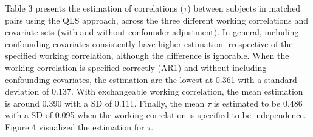 \documentclass[
]{aft}
\begin{document}
\begin{table}[H]
\centering\centering
\caption{\footnotesize Comparison of mean estimation for the correlation among longitudinal measurements using GEE and QLS methods, with and without adjustment for age, sex, and BSA.}
\centering
{}
\end{table}

Table 3 presents the estimation of correlations (\(\tau\)) between
subjects in matched pairs using the QLS approach, across the three
different working correlations and covariate sets (with and without
confounder adjustment). In general, including confounding covariates
consistently have higher estimation irrespective of the specified
working correlation, although the difference is ignorable. When the
working correlation is specified correctly (AR1) and without including
confounding covariates, the estimation are the lowest at 0.361 with a
standard deviation of 0.137. With exchangeable working correlation, the
mean estimation is around 0.390 with a SD of 0.111. Finally, the mean
\(\tau\) is estimated to be 0.486 with a SD of 0.095 when the working
correlation is specified to be independence. Figure 4 visualized the
estimation for \(\tau\).
\end{document}
